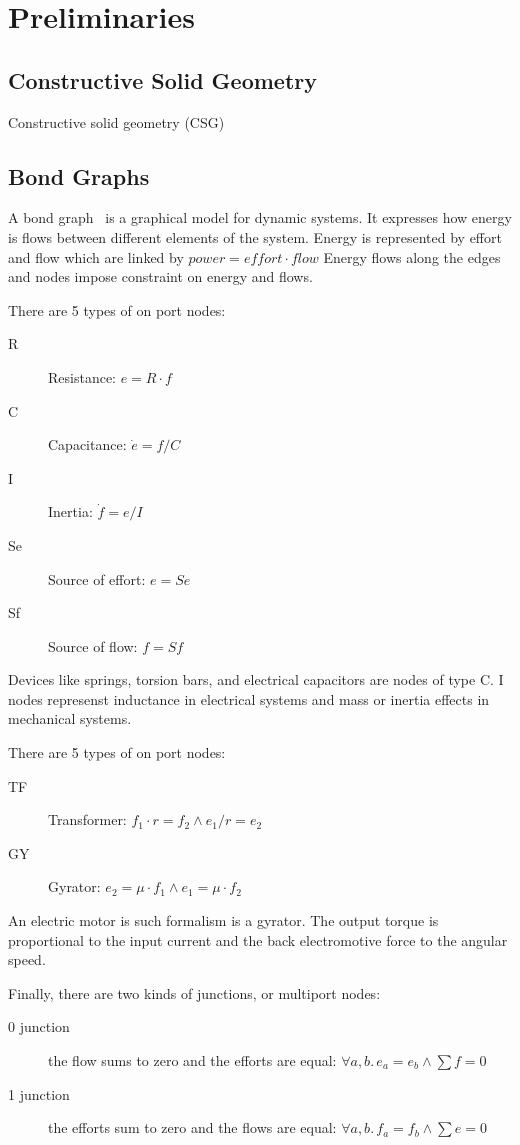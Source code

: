 \section{Preliminaries}
\label{sec:prelim}

\subsection{Constructive Solid Geometry}

Constructive solid geometry (CSG) 

\subsection{Bond Graphs}
A bond graph~\cite{Paynter} is a graphical model for dynamic systems.
It expresses how energy is flows between different elements of the system.
Energy is represented by effort and flow which are linked by $\mathit{power} = \mathit{effort} \cdot \mathit{flow}$
Energy flows along the edges and nodes impose constraint on energy and flows. 

There are 5 types of on port nodes:
\begin{description}
\item[R]  Resistance: $e = R \cdot f$
\item[C]  Capacitance: $\dot{e} = f/C$
\item[I]  Inertia: $\dot{f} = e/I$
\item[Se] Source of effort: $e = Se$
\item[Sf] Source of flow: $f = Sf$
\end{description}

Devices like springs, torsion bars, and electrical capacitors are nodes of type C.
I nodes represenst inductance in electrical systems and mass or inertia effects in mechanical systems.

There are 5 types of on port nodes:
\begin{description}
\item[TF] Transformer: $f_1 \cdot r = f_2 \land e_1/r = e_2$
\item[GY] Gyrator: $e_2 = \mu \cdot f_1 \land e_1 = \mu \cdot f_2$
\end{description}
    
An electric motor is such formalism is a gyrator.
The output torque is proportional to the input current and the back electromotive force to the angular speed.


Finally, there are two kinds of junctions, or multiport nodes:
\begin{description}
\item[0 junction] the flow sums to zero and the efforts are equal: $\forall a,b.\, e_a = e_b \land \sum f = 0$
\item[1 junction] the efforts sum to zero and the flows are equal: $\forall a,b.\, f_a = f_b \land \sum e = 0$
\end{description}

